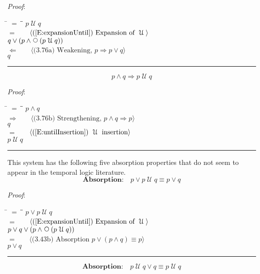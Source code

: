 \documentclass[12pt, fleqn, leqno]{article}
\newcommand{\lgap}{2pt}                             %
\newcommand{\mymathindent}{24pt}                    %
\newcommand{\impl}{\ensuremath{\Rightarrow}}        %
\newcommand{\foll}{\ensuremath{\Leftarrow}}         %
\newcommand{\Until}{\;\mathcal{U}\;}
\newcommand{\Next}{\;\,\text{\raisebox{3.5pt}{\circle{6}}}}
\newcommand{\myqed}{\rule[-.23ex]{1.2ex}{2.0ex}}
\newcommand{\myqedtab}{\hspace{384pt}}              %
\newcommand{\Gll} {\langle}                         %
\newcommand{\Ggg} {\rangle}                         %
\newcommand{\Hint}[1]     {\ \ \ $\Gll              \mbox{#1} \Ggg$ }   %
\begin{document}
\emph{Proof}:
\begin{tabbing}
\hspace{\mymathindent} \= $= \;$ \= \myqedtab \= \kill
\> \> $p \Until q$\\[\lgap]
\> $=$ \> \Hint{(\ref{E:expansionUntil}) Expansion of $\Until$} \\[\lgap]
\> \> $q \lor (p \land \Next(p \Until q))$\\[\lgap]
\> $\foll$ \> \Hint{(3.76a) Weakening, $p\impl p\lor q$} \\[\lgap]
\> \> $q$ \quad \myqed
\end{tabbing}
\begin{equation}\label{E:andImplUntil}
p \land q \impl p \Until q
\end{equation}

\emph{Proof}:
\begin{tabbing}
\hspace{\mymathindent} \= $= \;$ \= \myqedtab \= \kill
\> \> $p \land q$\\[\lgap]
  \> $\impl$ \> \Hint{(3.76b) Strengthening, $p\land q \impl p$} \\[\lgap]
\> \> $q$\\[\lgap]
\> $=$ \> \Hint{(\ref{E:untilInsertion}) $\Until$ insertion} \\[\lgap]
\> \> $p\Until q$ \quad \myqed
\end{tabbing}

This system has the following five absorption properties that do not seem to
appear in the temporal logic literature.
\begin{equation}\label{E:untilOrP}
\textbf{Absorption:}\quad p \lor p \Until q \equiv p \lor q
\end{equation}

\emph{Proof}:
\begin{tabbing}
\hspace{\mymathindent} \= $= \;$ \= \myqedtab \= \kill
  \> \>   $p \lor p \Until q$\\[\lgap]
  \> $=$  \>  \Hint{(\ref{E:expansionUntil}) Expansion of $\Until$}\\[\lgap]
  \> \>   $p \lor q \lor (p \land \Next(p \Until q))$\\[\lgap]
  \> $=$  \>  \Hint{(3.43b) Absorption $p \lor (p \land q) \equiv p$}\\[\lgap]
  \> \>   $p \lor q$ \quad \myqed
\end{tabbing}
\begin{equation}\label{E:untilOrQ}
\textbf{Absorption:}\quad p \Until q \lor q \equiv p \Until q
\end{equation}
\end{document}
